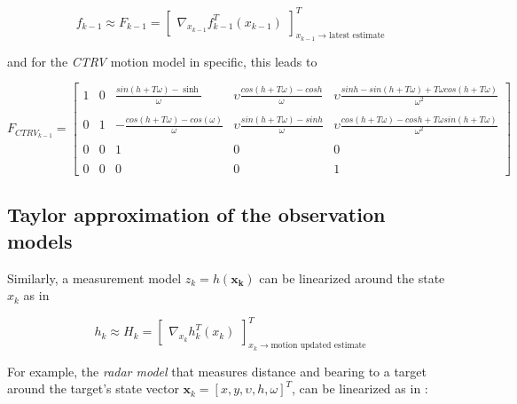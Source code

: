 \begin{equation}
\label{eq:linearization_jacob}
f_{k-1} \approx F_{k-1} =
\begin{bmatrix}
\nabla_{x_{k-1}} f_{k-1}^{T}(x_{k-1})
\end{bmatrix}_{x_{k-1} \rightarrow\text{latest estimate}}^{T}
\end{equation}


and for the \emph{CTRV} motion model in specific, this leads to 




\begin{equation}
\label{eq:linearization_mot_model}
F_{{CTRV}_{k-1}} =
\begin{bmatrix}1 &0 &\frac{sin(h+T\omega) - \sinh}{\omega} & \upsilon \frac{cos(h+T\omega)-cosh}{\omega} & \upsilon\frac{sinh -sin(h+T\omega) + T\omega cos(h+T\omega)}{\omega^{2}}\\\\
0 &1 &-\frac{cos(h+T\omega) - cos(\omega)}{\omega} &\upsilon \frac{sin(h+T\omega)-sinh}{\omega} & \upsilon\frac{cos(h + T\omega) -cosh + T\omega sin(h+T\omega)}{\omega^{2}}\\\\
0 &0 &1 &0 &0 \\\\
0 &0 &0 &0 &1\end{bmatrix}
\end{equation}


\subsection{Taylor approximation of the observation models}


Similarly, a measurement model $z_k=h(\mathbf{x_k})$ can be linearized around the state $x_{k}$ as in 


\begin{equation}
\label{eq:linearize_jacobian2}
h_{k} \approx H_{k} =
\begin{bmatrix}
\nabla_{x_{k}} h_{k}^{T}(x_{k})
\end{bmatrix}_{x_{k} \rightarrow\text{motion updated estimate}}^{T}
\end{equation}

For example, the \emph{radar model} that measures distance and bearing  to a target around the target's state vector $\mathbf{x}_k = [x,y,\upsilon,h,\omega]^T$, can be linearized as in :


